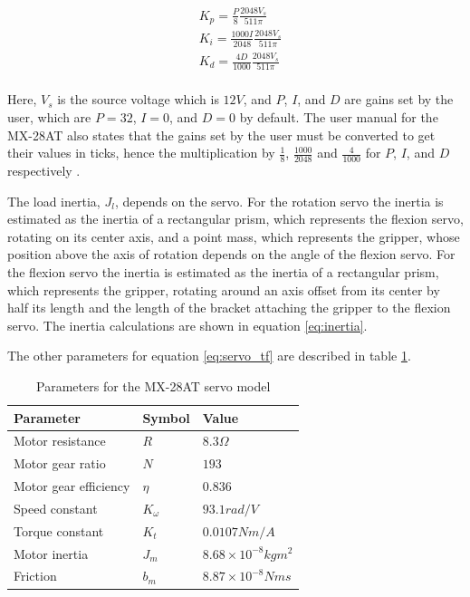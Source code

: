 \documentclass[letterpaper,12pt]{article}
\begin{document}
\begin{equation}
\begin{split}
	\label{eq:internal_gains_conversion}
	& K_p = \frac{P}{8} \frac{2048 V_s}{511 \pi} \\
	& K_i = \frac{1000 I}{2048} \frac{2048 V_s}{511 \pi} \\
	& K_d = \frac{4 D}{1000} \frac{2048 V_s}{511 \pi} \\
\end{split}
\end{equation}

Here, $V_s$ is the source voltage which is $12 V$, and $P$, $I$, and $D$ are gains set by the user, which are $P=32$, $I=0$, and $D=0$ by default. The user manual for the MX-28AT also states that the gains set by the user must be converted to get their values in ticks, hence the multiplication by $\frac{1}{8}$, $\frac{1000}{2048}$ and $\frac{4}{1000}$ for $P$, $I$, and $D$ respectively \cite{robotis}.

The load inertia, $J_l$, depends on the servo. For the rotation servo the inertia is estimated as the inertia of a rectangular prism, which represents the flexion servo, rotating on its center axis, and a point mass, which represents the gripper, whose position above the axis of rotation depends on the angle of the flexion servo. For the flexion servo the inertia is estimated as the inertia of a rectangular prism, which represents the gripper, rotating around an axis offset from its center by half its length and the length of the bracket attaching the gripper to the flexion servo. The inertia calculations are shown in equation \ref{eq:inertia}.



The other parameters for equation \ref{eq:servo_tf} are described in table \ref{tab:servo_params}.

\begin{table}[H]
	\begin{center}
		\caption{Parameters for the MX-28AT servo model \cite{m.r.o.a.maximo}}
        \label{tab:servo_params}
        \begin{tabular}{l|l|l}
        Parameter & Symbol & Value \\
        \hline
				Motor resistance & $R$ & $8.3 \Omega$ \\
				Motor gear ratio & $N$ & $193$ \\
				Motor gear efficiency & $\eta$ & $0.836$ \\
				Speed constant & $K_{\omega}$ & $93.1 rad/V$ \\
				Torque constant & $K_t$ & $0.0107 Nm/A$ \\
				Motor inertia & $J_m$ & $8.68 \times 10^{-8} kgm^2$ \\
				Friction & $b_m$ & $8.87 \times 10^{-8} Nms$ \\
        \end{tabular}
	\end{center}
\end{table}
\end{document}
